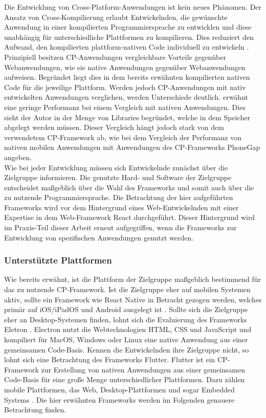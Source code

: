 \documentclass[a4paper]{scrartcl}
\begin{document}
Die Entwicklung von Cross-Platform-Anwendungen ist kein neues Phänomen. Der Ansatz von Cross-Kompilierung erlaubt Entwickelnden, die gewünschte Anwendung in einer kompilierten Programmiersprache zu entwicklen und diese unabhängig für unterschiedliche Plattformen zu kompilieren. Dies reduziert den Aufwand, den kompilierten plattform-nativen Code individuell zu entwickeln \autocite[7]{Xamarin}. \\
Prinzipiell besitzen CP-Anwendungen vergleichbare Vorteile gegenüber Webanwendungen, wie sie native Anwendungen gegenüber Webanwendungen aufweisen. Begründet liegt dies in dem bereits erwähnten kompilierten nativen Code für die jeweilige Plattform. Werden jedoch CP-Anwendungen mit nativ entwickelten Anwendungen verglichen, werden Unterschiede deutlich. \textcite[7]{Xamarin} erwähnt eine geringe Performanz bei einem Vergleich mit nativen Anwendungen. Dies sieht der Autor in der Menge von Libraries begründet, welche in dem Speicher abgelegt werden müssen. Dieser Vergleich hängt jedoch stark von dem verwendetem CP-Framework ab, wie \textcite[134]{CP-mobile} bei dem Vergleich der Performanz von nativen mobilen Anwendungen mit Anwendungen des CP-Frameworks PhoneGap angeben. \\
Wie bei jeder Entwicklung müssen sich Entwickelnde zunächst über die Zielgruppe informieren. Die genutzte Hard- und Software der Zielgruppe entscheidet maßgeblich über die Wahl des Frameworks und somit auch über die zu nutzende Programmiersprache. Die Betrachtung der hier aufgeführten Frameworks wird vor dem Hintergrund eines Web-Entwickelnden mit einer Expertise in dem Web-Framework React durchgeführt. Dieser Hintergrund wird im Praxis-Teil dieser Arbeit erneut aufgegriffen, wenn die Frameworks zur Entwicklung von spezifischen Anwendungen genutzt werden.

\subsubsection{Unterstützte Plattformen}

Wie bereits erwähnt, ist die Plattform der Zielgruppe maßgeblich bestimmend für das zu nutzende CP-Framework. Ist die Zielgruppe eher auf mobilen Systemen aktiv, sollte ein Framework wie React Native in Betracht gezogen werden, welches primär auf iOS/iPadOS und Android ausgelegt ist \autocite{React_Native}. Sollte sich die Zielgruppe eher an Desktop-Systemen finden, lohnt sich die Evaluierung des Frameworks Eletron \autocite{Electron.js}. Electron nutzt die Webtechnologien HTML, CSS und JavaScript und kompiliert für MacOS, Windows oder Linux eine native Anwendung aus einer gemeinsamen Code-Basis. Kennen die Entwickelnden ihre Zielgruppe nicht, so lohnt sich eine Betrachtung des Frameworks Flutter. Flutter ist ein CP-Framework zur Erstellung von nativen Anwendungen aus einer gemeinsamen Code-Basis für eine große Menge unterschiedlicher Plattformen. Dazu zählen mobile Plattformen, das Web, Desktop-Plattformen und sogar Embedded Systems \autocite{Flutter}. Die hier erwähnten Frameworks werden im Folgenden genauere Betrachtung finden.
\end{document}

